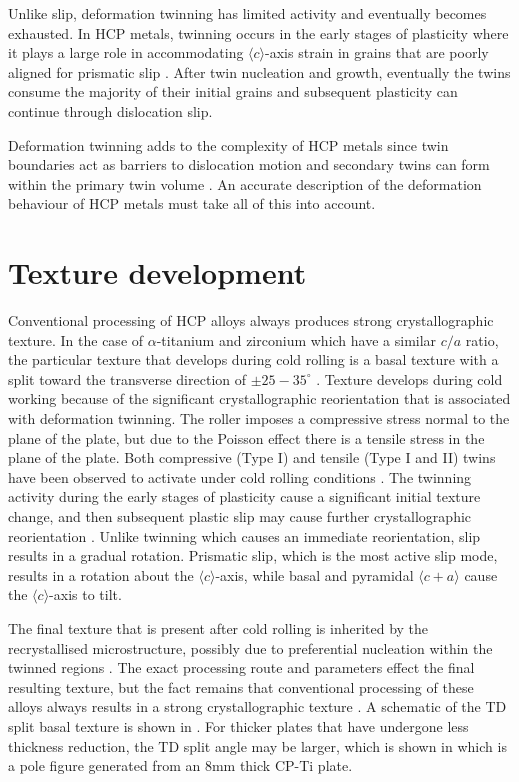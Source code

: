 Unlike slip, deformation twinning has limited activity and eventually becomes exhausted.
In HCP metals, twinning occurs in the early stages of plasticity where it plays a large role in accommodating $\langle c \rangle$-axis strain in grains that are poorly aligned for prismatic slip \cite{nervoStudyDeformationTwinning2016}.
After twin nucleation and growth, eventually the twins consume the majority of their initial grains and subsequent plasticity can continue through dislocation slip.

Deformation twinning adds to the complexity of HCP metals since twin boundaries act as barriers to dislocation motion and secondary twins can form within the primary twin volume \cite{christianDeformationTwinning1995}.
An accurate description of the deformation behaviour of HCP metals must take all of this into account.

\section{Texture development}
Conventional processing of HCP alloys always produces strong crystallographic texture.
In the case of $\alpha$-titanium and zirconium which have a similar $c/a$ ratio, the particular texture that develops during cold rolling is a basal texture with a split toward the transverse direction of $\pm 25-35^\circ$ \cite{leeDevelopmentRollingTexture1988}.
Texture develops during cold working because of the significant crystallographic reorientation that is associated with deformation twinning.
The roller imposes a compressive stress normal to the plane of the plate, but due to the Poisson effect there is a tensile stress in the plane of the plate.
Both compressive (Type I) and tensile (Type I and II) twins have been observed to activate under cold rolling conditions \cite{bozzoloMisorientationsInducedDeformation2010}.
The twinning activity during the early stages of plasticity cause a significant initial texture change, and then subsequent plastic slip may cause further crystallographic reorientation \cite{zhongRoleDeformationTwin2008}.
Unlike twinning which causes an immediate reorientation, slip results in a gradual rotation.
Prismatic slip, which is the most active slip mode, results in a rotation about the $\langle c \rangle$-axis, while basal and pyramidal $\langle c + a \rangle$ cause the $\langle c \rangle$-axis to tilt.

The final texture that is present after cold rolling is inherited by the recrystallised microstructure, possibly due to preferential nucleation within the twinned regions \cite{guoTextureDevelopmentMechanical2021}.
The exact processing route and parameters effect the final resulting texture, but the fact remains that conventional processing of these alloys always results in a strong crystallographic texture \cite{chunEffectDeformationTwinning2005}.
A schematic of the TD split basal texture is shown in .
For thicker plates that have undergone less thickness reduction, the TD split angle may be larger, which is shown in  which is a pole figure generated from an 8mm thick CP-Ti plate.


